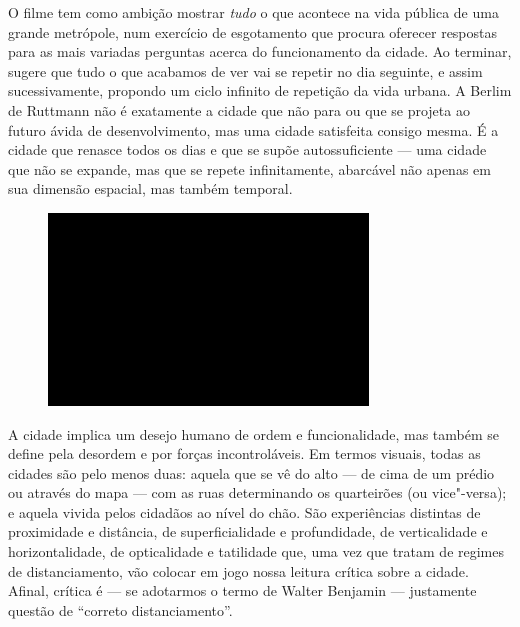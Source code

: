 O filme tem como ambição mostrar \emph{tudo} o que acontece na vida
pública de uma grande metrópole, num exercício de esgotamento que
procura oferecer respostas para as mais variadas perguntas acerca do
funcionamento da cidade. Ao terminar, sugere que tudo o que acabamos de
ver vai se repetir no dia seguinte, e assim sucessivamente, propondo um
ciclo infinito de repetição da vida urbana.
A Berlim de Ruttmann não é exatamente a cidade que não
para ou que se projeta ao futuro ávida de desenvolvimento, mas uma
cidade satisfeita consigo mesma. É a cidade que renasce todos os dias e
que se supõe autossuficiente --- uma cidade que não se expande, mas que
se repete infinitamente, abarcável não apenas em sua dimensão espacial,
mas também temporal.

\begin{figure}[!ht]

\centering
 \includegraphics[width=85mm]{./imgs/im1.jpg}
\caption{\tiny{}}

\end{figure}

A cidade implica um desejo humano de ordem e funcionalidade, mas também
se define pela desordem e por forças incontroláveis. Em
termos visuais, todas as cidades são pelo menos duas: aquela que se vê
do alto --- de cima de um prédio ou através do mapa --- com as ruas
determinando os quarteirões (ou vice"-versa); e aquela vivida pelos
cidadãos ao nível do chão. São experiências distintas de proximidade e
distância, de superficialidade e profundidade, de verticalidade e
horizontalidade, de opticalidade e tatilidade que, uma vez que tratam de
regimes de distanciamento, vão colocar em jogo nossa leitura crítica
sobre a cidade. Afinal, crítica é --- se adotarmos o termo de Walter
Benjamin --- justamente questão de ``correto distanciamento''.

